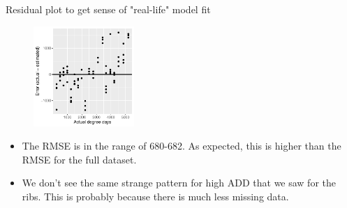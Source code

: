 \documentclass{beamer}
\begin{document}
\begin{frame}{Residual plot to get sense of "real-life" model fit}

  \begin{center}
    \begin{figure}
      \includegraphics[width=1.5in]{w_scapulae/leave_out_one_scapula_and_one_day_residuals}
    \end{figure}
  \end{center}
  
  \vspace{0.1in}

  {\scriptsize
    \begin{itemize}
    \item The RMSE is in the range of 680-682.  As expected, this is
      higher than the RMSE for the full dataset.
    \item We don't see the same strange pattern for high ADD that we
      saw for the ribs.  This is probably because there is much less
      missing data.
    \end{itemize}
  }

\end{frame}
\end{document}
